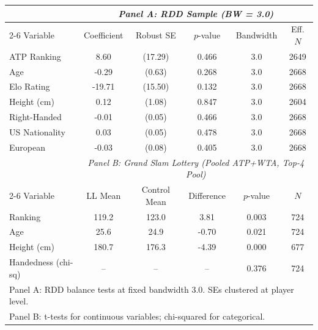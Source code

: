 \begin{tabular}{lccccc}
\toprule
 & \multicolumn{5}{c}{\textit{Panel A: RDD Sample (BW = 3.0)}} \\
\cmidrule(lr){2-6}
Variable & Coefficient & Robust SE & $p$-value & Bandwidth & Eff. $N$ \\
\midrule
ATP Ranking & 8.60 & (17.29) & 0.466 & 3.0 & 2649 \\
Age & -0.29 & (0.63) & 0.268 & 3.0 & 2668 \\
Elo Rating & -19.71 & (15.50) & 0.132 & 3.0 & 2668 \\
Height (cm) & 0.12 & (1.08) & 0.847 & 3.0 & 2604 \\
Right-Handed & -0.01 & (0.05) & 0.466 & 3.0 & 2668 \\
US Nationality & 0.03 & (0.05) & 0.478 & 3.0 & 2668 \\
European & -0.03 & (0.08) & 0.405 & 3.0 & 2668 \\
\midrule
 & \multicolumn{5}{c}{\textit{Panel B: Grand Slam Lottery (Pooled ATP+WTA, Top-4 Pool)}} \\
\cmidrule(lr){2-6}
Variable & LL Mean & Control Mean & Difference & $p$-value & $N$ \\
\midrule
Ranking & 119.2 & 123.0 & 3.81 & 0.003 & 724 \\
Age & 25.6 & 24.9 & -0.70 & 0.021 & 724 \\
Height (cm) & 180.7 & 176.3 & -4.39 & 0.000 & 677 \\
Handedness (chi-sq) & -- & -- & -- & 0.376 & 724 \\
\midrule
\multicolumn{6}{l}{\footnotesize Panel A: RDD balance tests at fixed bandwidth 3.0. SEs clustered at player level.} \\
\multicolumn{6}{l}{\footnotesize Panel B: t-tests for continuous variables; chi-squared for categorical.} \\
\bottomrule
\end{tabular}

